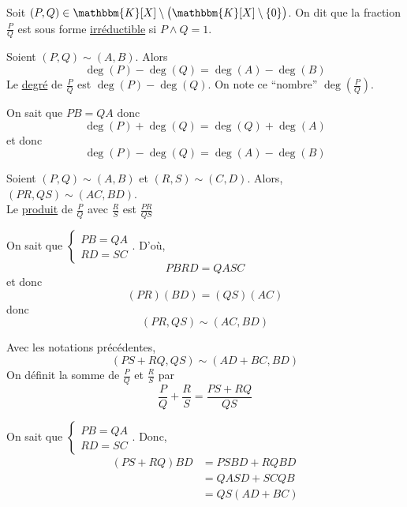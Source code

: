 \begin{defn}
	Soit $(P,Q) \in \mathbbm{K}[X]\setminus\big(\mathbbm{K}[X] \setminus \{0\} \big)$. On dit que la fraction $\frac{P}{Q}$ est sous forme \underline{irréductible} si $P\wedge Q = 1$.
\end{defn}

\begin{prop-defn}
	Soient $(P,Q) \sim (A,B)$. Alors \[
		\deg(P) - \deg(Q) = \deg(A) - \deg(B)
	\] Le \underline{degré} de $\frac{P}{Q}$ est $\deg(P) - \deg(Q)$. On note ce ``nombre'' $\deg\left( \frac{P}{Q} \right)$.
\end{prop-defn}

\begin{prv}
	On sait que $PB = QA$ donc \[
		\deg(P) + \deg(Q) = \deg(Q) + \deg(A)
	\] et donc \[
		\deg(P) - \deg(Q) = \deg(A) - \deg(B)
	\]
\end{prv}

\begin{prop-defn}
	Soient $(P,Q)\sim (A,B)$ et $(R, S)\sim (C,D)$. Alors, $(PR, QS)\sim(AC, BD)$.\\
	Le \underline{produit} de $\frac{P}{Q}$ avec $\frac{R}{S}$ est $\frac{PR}{QS}$
\end{prop-defn}

\begin{prv}
	On sait que $\begin{cases}
		PB = QA\\
		RD = SC
	\end{cases}$. D'où, \[
		PBRD = QASC
	\] et donc \[
		(PR)(BD) = (QS)(AC)
	\] donc \[
	(PR, QS) \sim (AC, BD)
	\] 
\end{prv}

\begin{prop-defn}
	Avec les notations précédentes, \[
		(PS + RQ, QS) \sim (AD + BC, BD)
	\] On définit la somme de $\frac{P}{Q}$ et $\frac{R}{S}$ par \[
		\frac{P}{Q} + \frac{R}{S} = \frac{PS + RQ}{QS}
	\] 
\end{prop-defn}

\begin{prv}
	On sait que $\begin{cases}
		PB = QA\\
		RD = SC
	\end{cases}$. Donc,
	\begin{align*}
		(PS + RQ) BD &= PSBD + RQBD \\
		&= QASD + SCQB \\
		&= QS(AD + BC) \\
	\end{align*}
\end{prv}


